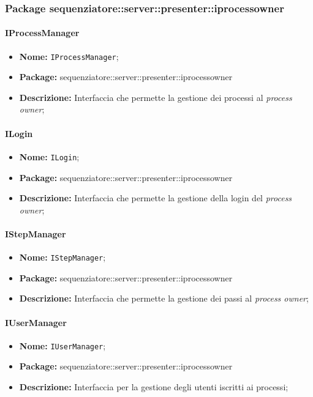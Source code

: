 \subsubsection{Package sequenziatore::server::presenter::iprocessowner}
\paragraph{IProcessManager}
	\begin{itemize}
		\item \textbf{Nome:} \texttt{IProcessManager};
		\item \textbf{Package:} sequenziatore::server::presenter::iprocessowner
		\item \textbf{Descrizione:} Interfaccia che permette la gestione dei processi al \textit{process owner};
	\end{itemize}

\paragraph{ILogin}
	\begin{itemize}
		\item \textbf{Nome:} \texttt{ILogin};
		\item \textbf{Package:} sequenziatore::server::presenter::iprocessowner
		\item \textbf{Descrizione:} Interfaccia che permette la gestione della login del \textit{process owner};
	\end{itemize}

\paragraph{IStepManager}
	\begin{itemize}
		\item \textbf{Nome:} \texttt{IStepManager};
		\item \textbf{Package:} sequenziatore::server::presenter::iprocessowner
		\item \textbf{Descrizione:} Interfaccia che permette la gestione dei passi al \textit{process owner};
	\end{itemize}

\paragraph{IUserManager}
	\begin{itemize}
		\item \textbf{Nome:} \texttt{IUserManager};
		\item \textbf{Package:} sequenziatore::server::presenter::iprocessowner
		\item \textbf{Descrizione:} Interfaccia per la gestione degli utenti iscritti ai processi;
	\end{itemize}


